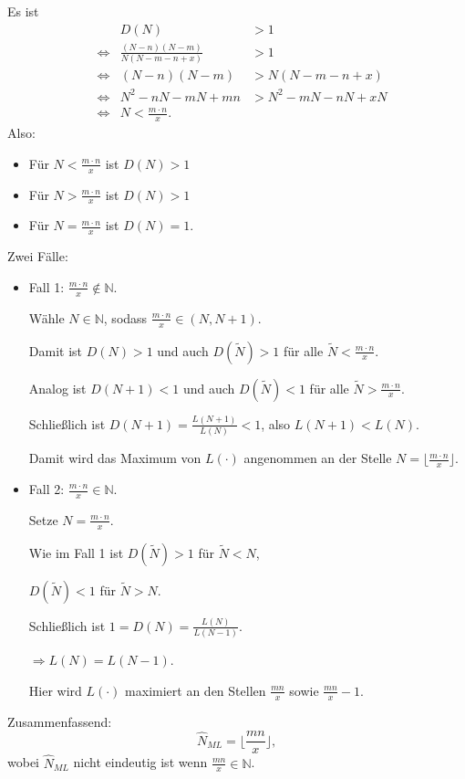 \documentclass{tstextbook}
\newcommand{\N}{\mathbb N}
\begin{document}
\begin{example}
	Es ist 
	\[
	\begin{aligned}
		&& D(N) & > 1 \\
		& \Leftrightarrow & \frac{(N-n)(N-m)}{N(N-m-n+x)} & > 1 \\
		& \Leftrightarrow & (N-n)(N-m) & > N(N-m-n+x) \\
		& \Leftrightarrow & N^2-nN-mN+mn & > N^2-mN-nN+xN \\
		& \Leftrightarrow & N < \frac{m\cdot n}{x}.
	\end{aligned}
	\]
	Also: 
	\begin{itemize}
		\item Für $ N < \frac{m\cdot n}{x} $ ist $ D(N) > 1 $
		\item Für $ N > \frac{m\cdot n}{x} $ ist $ D(N) > 1 $
		\item Für $ N = \frac{m\cdot n}{x} $ ist $ D(N) = 1 $.
	\end{itemize}

Zwei Fälle:
	\begin{itemize}
		\item Fall 1: 
		$ \frac{m\cdot n}{x}\notin \N $. 
		
		Wähle $ N \in \N $, sodass $ \frac{m\cdot n}{x} \in (N, N+1) $. 
		
		Damit ist $ D(N) > 1 $ und auch $ D(\tilde{N}) > 1 $ für alle $ \tilde{N} < \frac{m\cdot n}{x} $. 
		
		Analog ist $ D(N+1) < 1 $ und auch $ D(\tilde{N}) < 1 $ für alle $ \tilde{N} > \frac{m\cdot n}{x} $.
		
		Schließlich ist $ D(N+1) = \frac{L(N+1)}{L(N)} < 1 $, also $ L(N+1) < L(N) $. 
		
		Damit wird das Maximum von $ L(\cdot) $ angenommen an der Stelle $ N = \lfloor\frac{m\cdot n}{x}\rfloor $.
		\item Fall 2: 
		$ \frac{m\cdot n}{x} \in \N $. 
		
		Setze $ N = \frac{m\cdot n}{x} $.
		
		Wie im Fall 1 ist $ D(\tilde{N}) > 1 $ für $ \tilde{N} < N $, 
		
		$ D(\tilde{N}) < 1 $ für $ \tilde{N} > N $.
		
		Schließlich ist $ 1 = D(N) = \frac{L(N)}{L(N-1)} $.
		
		$ \Rightarrow L(N) = L(N-1) $. 
		
		Hier wird $ L(\cdot) $ maximiert an den Stellen $ \frac{mn}{x} $ sowie $ \frac{mn}{x} -1 $. 
	\end{itemize}

	Zusammenfassend: 
	\[
	\hat{N}_{ML} = \lfloor\frac{mn}{x}\rfloor,
	\]
	wobei $ \hat{N}_{ML} $ nicht eindeutig ist wenn $ \frac{mn}{x} \in \N $.
\end{example}
\end{document}
